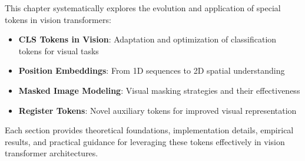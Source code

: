 This chapter systematically explores the evolution and application of special tokens in vision transformers:

\begin{itemize}
\item \textbf{CLS Tokens in Vision}: Adaptation and optimization of classification tokens for visual tasks
\item \textbf{Position Embeddings}: From 1D sequences to 2D spatial understanding
\item \textbf{Masked Image Modeling}: Visual masking strategies and their effectiveness
\item \textbf{Register Tokens}: Novel auxiliary tokens for improved visual representation
\end{itemize}

Each section provides theoretical foundations, implementation details, empirical results, and practical guidance for leveraging these tokens effectively in vision transformer architectures.